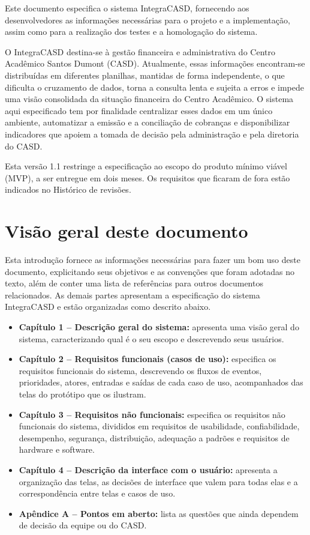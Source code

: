 \documentclass[11pt,a4paper,oneside]{report}
\begin{document}
Este documento especifica o sistema IntegraCASD, fornecendo aos desenvolvedores as informações
necessárias para o projeto e a implementação, assim como para a realização dos testes e a
homologação do sistema.

O IntegraCASD destina-se à gestão financeira e administrativa do Centro Acadêmico Santos Dumont
(CASD). Atualmente, essas informações encontram-se distribuídas em diferentes planilhas, mantidas
de forma independente, o que dificulta o cruzamento de dados, torna a consulta lenta e sujeita a
erros e impede uma visão consolidada da situação financeira do Centro Acadêmico. O sistema aqui
especificado tem por finalidade centralizar esses dados em um único ambiente, automatizar a emissão
e a conciliação de cobranças e disponibilizar indicadores que apoiem a tomada de decisão pela
administração e pela diretoria do CASD.

Esta versão 1.1 restringe a especificação ao escopo do produto mínimo viável (MVP), a ser entregue
em dois meses. Os requisitos que ficaram de fora estão indicados no Histórico de revisões.

\section*{Visão geral deste documento}

Esta introdução fornece as informações necessárias para fazer um bom uso deste documento,
explicitando seus objetivos e as convenções que foram adotadas no texto, além de conter uma lista
de referências para outros documentos relacionados. As demais partes apresentam a especificação do
sistema IntegraCASD e estão organizadas como descrito abaixo.
\begin{itemize}
  \item \textbf{Capítulo 1 -- Descrição geral do sistema:} apresenta uma visão geral do sistema,
        caracterizando qual é o seu escopo e descrevendo seus usuários.
  \item \textbf{Capítulo 2 -- Requisitos funcionais (casos de uso):} especifica os requisitos
        funcionais do sistema, descrevendo os fluxos de eventos, prioridades, atores, entradas e
        saídas de cada caso de uso, acompanhados das telas do protótipo que os ilustram.
  \item \textbf{Capítulo 3 -- Requisitos não funcionais:} especifica os requisitos não funcionais
        do sistema, divididos em requisitos de usabilidade, confiabilidade, desempenho, segurança,
        distribuição, adequação a padrões e requisitos de hardware e software.
  \item \textbf{Capítulo 4 -- Descrição da interface com o usuário:} apresenta a organização das
        telas, as decisões de interface que valem para todas elas e a correspondência entre telas e
        casos de uso.
  \item \textbf{Apêndice A -- Pontos em aberto:} lista as questões que ainda dependem de decisão
        da equipe ou do CASD.
\end{itemize}
\end{document}
